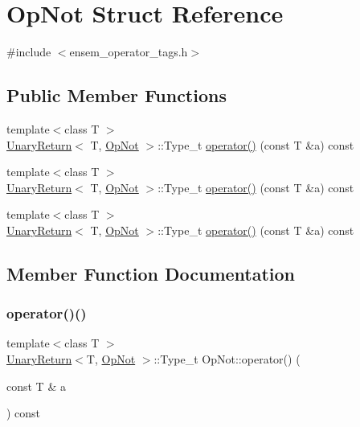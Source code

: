 \hypertarget{structOpNot}{}\section{Op\+Not Struct Reference}
\label{structOpNot}


{\ttfamily \#include $<$ensem\+\_\+operator\+\_\+tags.\+h$>$}

\subsection*{Public Member Functions}
\begin{DoxyCompactItemize}
\item 
{\footnotesize template$<$class T $>$ }\\\mbox{\hyperlink{structUnaryReturn}{Unary\+Return}}$<$ T, \mbox{\hyperlink{structOpNot}{Op\+Not}} $>$\+::Type\+\_\+t \mbox{\hyperlink{structOpNot_ac76618313170c606b7fb1ca1c2b0f164}{operator()}} (const T \&a) const
\item 
{\footnotesize template$<$class T $>$ }\\\mbox{\hyperlink{structUnaryReturn}{Unary\+Return}}$<$ T, \mbox{\hyperlink{structOpNot}{Op\+Not}} $>$\+::Type\+\_\+t \mbox{\hyperlink{structOpNot_ac76618313170c606b7fb1ca1c2b0f164}{operator()}} (const T \&a) const
\item 
{\footnotesize template$<$class T $>$ }\\\mbox{\hyperlink{structUnaryReturn}{Unary\+Return}}$<$ T, \mbox{\hyperlink{structOpNot}{Op\+Not}} $>$\+::Type\+\_\+t \mbox{\hyperlink{structOpNot_ac76618313170c606b7fb1ca1c2b0f164}{operator()}} (const T \&a) const
\end{DoxyCompactItemize}


\subsection{Member Function Documentation}
\mbox{\label{structOpNot_ac76618313170c606b7fb1ca1c2b0f164}} 
\subsubsection{\texorpdfstring{operator()()}{operator()()}\hspace{0.1cm}{\footnotesize\ttfamily [1/3]}}
{\footnotesize\ttfamily template$<$class T $>$ \\
\mbox{\hyperlink{structUnaryReturn}{Unary\+Return}}$<$T, \mbox{\hyperlink{structOpNot}{Op\+Not}} $>$\+::Type\+\_\+t Op\+Not\+::operator() (\begin{DoxyParamCaption}\item[{const T \&}]{a }\end{DoxyParamCaption}) const\hspace{0.3cm}{\ttfamily [inline]}}

